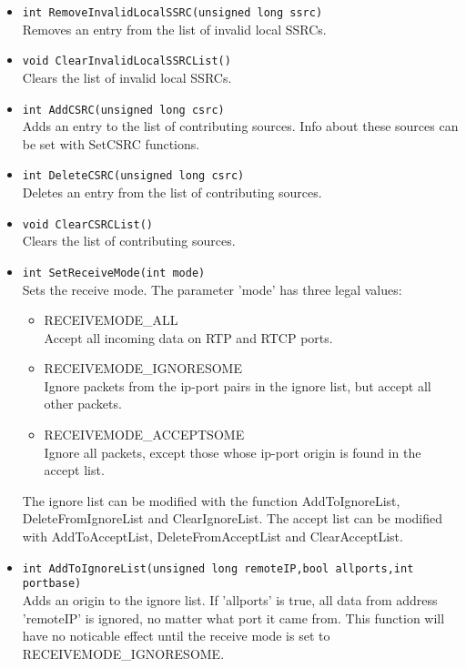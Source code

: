 \begin{itemize}
\item {\tt int RemoveInvalidLocalSSRC(unsigned long ssrc)}\\
	Removes an entry from the list of invalid local SSRCs.

\item {\tt void ClearInvalidLocalSSRCList()}\\
	Clears the list of invalid local SSRCs.

\item {\tt int AddCSRC(unsigned long csrc)}\\
	Adds an entry to the list of contributing sources. Info about these
	sources can be set with SetCSRC functions.

\item {\tt int DeleteCSRC(unsigned long csrc)}\\
	Deletes an entry from the list of contributing sources.

\item {\tt void ClearCSRCList()}\\
	Clears the list of contributing sources.

\item {\tt int SetReceiveMode(int mode)}\\
	Sets the receive mode. The parameter 'mode' has three legal values:
	\begin{itemize}
	\item RECEIVEMODE\_ALL \\
		Accept all incoming data on RTP and RTCP ports.
	\item RECEIVEMODE\_IGNORESOME \\
		Ignore packets from the ip-port pairs in the ignore list, but
		accept all other packets.		
	\item RECEIVEMODE\_ACCEPTSOME \\
		Ignore all packets, except those whose ip-port origin is
		found in the accept list.
	\end{itemize}
	The ignore list can be modified with the function AddToIgnoreList,
	DeleteFromIgnoreList and ClearIgnoreList. The accept list can be
	modified with AddToAcceptList, DeleteFromAcceptList and
	ClearAcceptList.
		
\item {\tt int AddToIgnoreList(unsigned long remoteIP,bool allports,int portbase)}\\
	Adds an origin to the ignore list. If 'allports' is true, all
	data from address 'remoteIP' is ignored, no matter what port it
	came from. This function will have no noticable effect until the
	receive mode is set to RECEIVEMODE\_IGNORESOME.


\end{itemize}
